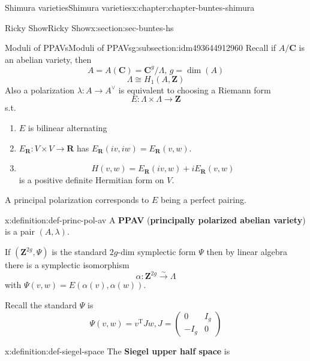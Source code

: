 \documentclass[oneside,10pt,]{book}
\newcommand{\terminology}[1]{\textbf{#1}}
\numberwithin{equation}{section}
\newcommand{\ZZ}{\mathbf{Z}}
\newcommand{\RR}{\mathbf{R}}
\newcommand{\CC}{\mathbf{C}}
\newcommand{\transpose}{\mathrm{T}}
\newcommand{\amp}{&}
\begin{document}
\begin{chapterptx}{Shimura varieties}{}{Shimura varieties}{}{}{x:chapter:chapter-buntes-shimura}
\begin{sectionptx}{Ricky Show}{}{Ricky Show}{}{}{x:section:sec-buntes-hs}
\typeout{************************************************}
%
\begin{subsectionptx}{Moduli of PPAVs}{}{Moduli of PPAVs}{}{}{g:subsection:idm493644912960}
Recall if \(A/ \CC\) is an abelian variety,  then%
\begin{equation*}
A = A(\CC) =  \CC^g/ \Lambda, \,g = \dim (A)
\end{equation*}
%
\begin{equation*}
\Lambda \cong H_1(A,\ZZ)
\end{equation*}
Also a polarization \(\lambda \colon A \to A^\vee\) is equivalent to choosing a Riemann form%
\begin{equation*}
E \colon \Lambda \times \Lambda \to \ZZ
\end{equation*}
s.t.%
\begin{enumerate}
\item{}\(E\) is bilinear alternating%
\item{}\(E_\RR \colon V\times V \to \RR\) has \(E_\RR(iv,iw)  = E_\RR( v,w)\).%
\item{}%
\begin{equation*}
H(v,w) = E_\RR(iv, w) + i E_\RR(v,w)
\end{equation*}
is a positive definite Hermitian form on \(V\).%
\end{enumerate}
A principal polarization corresponds to \(E\) being a perfect pairing.%
\begin{definition}{}{x:definition:def-princ-pol-av}%
A \terminology{PPAV} (\terminology{principally polarized abelian variety}) is a pair \((A,\lambda)\).%
\end{definition}
If \((\ZZ^{2g}, \Psi)\) is the standard \(2g\)-dim symplectic form \(\Psi\) then by linear algebra there is a symplectic isomorphism%
\begin{equation*}
\alpha \colon \ZZ^{2g} \xrightarrow\sim \Lambda
\end{equation*}
with \(\Psi(v,w) = E(\alpha(v), \alpha(w))\).%
\par
Recall the standard \(\Psi\) is%
\begin{equation*}
\Psi (v,w) = v^\transpose J w, J = \begin{pmatrix} 0 \amp I_g \\ -I_g \amp 0\end{pmatrix}
\end{equation*}
%
\begin{definition}{}{x:definition:def-siegel-space}%
The \terminology{Siegel upper half space} is%

\end{definition}
\end{subsectionptx}
\end{sectionptx}
\end{chapterptx}
\end{document}
